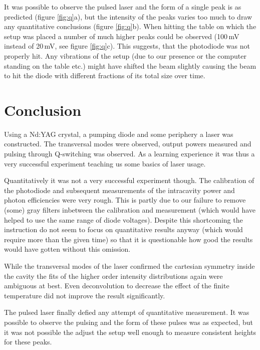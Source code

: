 \documentclass[a4paper]{scrartcl}
\numberwithin{equation}{section}
\numberwithin{figure}{section}
\numberwithin{table}{section}
\begin{document}
It was possible to observe the pulsed laser and the form of a single peak is as predicted (figure \ref{fig:q}a), but the intensity of the peaks varies too much to draw any quantitative conclusions (figure \ref{fig:q}b). When hitting the table on which the setup was placed a number of much higher peaks could be observed (100\,mV instead of 20\,mV, see figure \ref{fig:q}c). This suggests, that the photodiode was not properly hit. Any vibrations of the setup (due to our presence or the computer standing on the table etc.) might have shifted the beam slightly causing the beam to hit the diode with different fractions of its total size over time.
\clearpage


\section{Conclusion}
Using a Nd:YAG crystal, a pumping diode and some periphery a laser was constructed. The transversal modes were observed, output powers measured and pulsing through Q-switching was observed. As a learning experience it was thus a very successful experiment teaching us some basics of laser usage.

Quantitatively it was not a very successful experiment though. The calibration of the photodiode and subsequent measurements of the intracavity power and photon efficiencies were very rough. This is partly due to our failure to remove (some) gray filters inbetween the calibration and measurement (which would have helped to use the same range of diode voltages). Despite this shortcoming the instruction do not seem to focus on quantitative results anyway (which would require more than the given time) so that it is questionable how good the results would have gotten without this omission.

While the transversal modes of the laser confirmed the cartesian symmetry inside the cavity the fits of the higher order intensity distributions again were ambiguous at best. Even deconvolution to decrease the effect of the finite temperature did not improve the result significantly.

The pulsed laser finally defied any attempt of quantitative measurement. It was possible to observe the pulsing and the form of these pulses was as expected, but it was not possible the adjust the setup well enough to measure consistent heights for these peaks.


 

\end{document}
